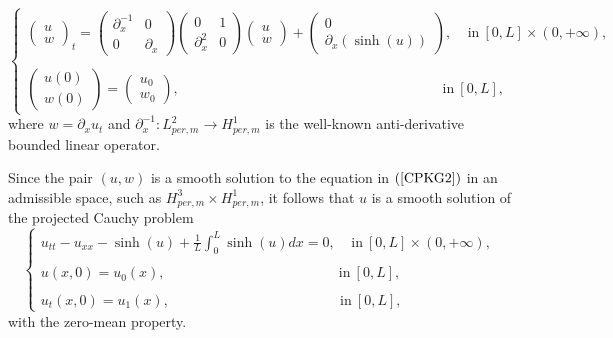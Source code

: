 \documentclass[12pt,reqno,a4paper]{amsart} %
\numberwithin{equation}{section}
\numberwithin{figure}{section}
\begin{document}
\begin{equation}\label{CPKG2}
	\begin{cases}
		\left(\begin{array}{lll}u\\w\end{array}\right)_t
		=\left(\begin{array}{lll}\partial_x^{-1}&  0\\ 0&  \partial_x\end{array}\right)\left(\begin{array}{lll}0&  1\\ \partial_x^2&  0\end{array}\right)\left(\begin{array}{lll}u\\w\end{array}\right)+\left(\begin{array}{ccc}0\\ \partial_x(\sinh(u))\end{array}\right),\:\:\:\:\:\text{in} \: [0,L]\times(0,+\infty),\\\\
		\left(\begin{array}{lll}u(0)\\w(0)\end{array}\right)=\left(\begin{array}{ccc}u_0\\ w_0\end{array}\right), \:\:\:\:\:\:\:\:\:\:\:\:\:\:\:\:\:\:\:\:\:\:\:\:\:\:\:\:\:\:\:\:\:\:\:\:\:\:\:\:\:\:\:\:\:\:\:\:\:\:\:\:\:\:\:\: \:\:\:\:\: \:\:\:\:\: \:\:\:\:\: \:\:\:\:\:\:\:\:\:\:\:\:\:\:  \text{in} \: [0,L],
	\end{cases}
\end{equation}
where $w=\partial_xu_t$ and $\partial_x^{-1}:L_{per,m}^2\rightarrow H_{per,m}^1$ is the well-known anti-derivative bounded linear operator.

Since the pair $(u,w)$ is a smooth solution to the equation in $(\ref{CPKG2})$ in an admissible space, such as $H_{per,m}^3\times H_{per,m}^1$, it follows that $u$ is a smooth solution of the projected Cauchy problem 
\begin{equation}\label{CPKG3}
	\left\{\begin{array}{llll}
		\displaystyle u_{tt}-u_{xx}-\sinh(u)+\frac{1}{L}\int_0^L\sinh(u)dx=0, \:\:\:\: \:\text{in} \: [0,L]\times(0,+\infty), \\\\
	u(x,0)=u_0(x),\:\:\:\:\:\:\:\:\:\:\:\:\:\:\:\:\:\:\:\:\:\:\:\:\:\:\:\:\:\:\:\:\:\:\:\:\:\:\:\:\:\:\:\:\:\:\:\:\:\:\:\:\:\:\:\: \text{in} \: [0,L],\\\\
		u_t(x,0)= u_1(x),\:\:\:\:\:\:\:\:\:\:\:\:\:\:\:\:\:\:\:\:\:\:\:\:\:\:\:\:\:\:\:\:\:\:\:\:\:\:\:\:\:\:\:\:\:\:\:\:\:\:\:\:\:\:\: \text{in}\ [0,L],
	\end{array}\right.
\end{equation}
with the zero-mean property.  
\end{document}
